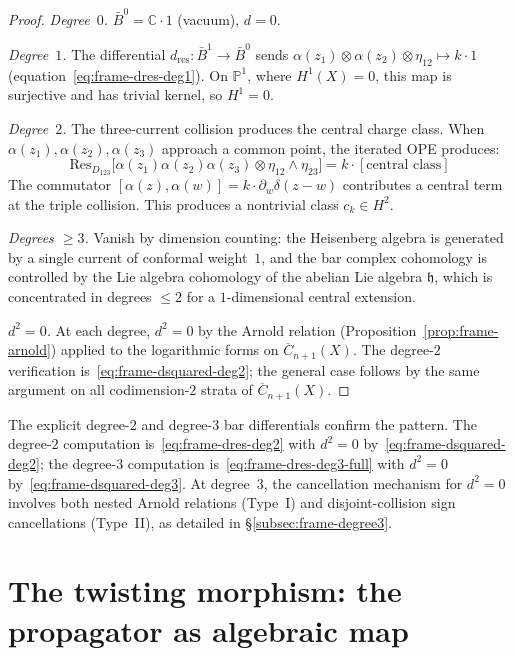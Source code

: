 \begin{proof}
\emph{Degree~$0$.}
$\bar{B}^0 = \mathbb{C} \cdot 1$ (vacuum), $d = 0$.

\emph{Degree~$1$.}
The differential $d_{\mathrm{res}}\colon \bar{B}^1 \to \bar{B}^0$
sends $\alpha(z_1) \otimes \alpha(z_2) \otimes \eta_{12} \mapsto k \cdot 1$
(equation~\eqref{eq:frame-dres-deg1}).
On $\mathbb{P}^1$, where $H^1(X) = 0$, this map is surjective
and has trivial kernel, so $H^1 = 0$.

\emph{Degree~$2$.}
The three-current collision produces the central charge class.
When $\alpha(z_1), \alpha(z_2), \alpha(z_3)$ approach a
common point, the iterated OPE produces:
\begin{equation}\label{eq:frame-triple-residue}
\mathrm{Res}_{D_{123}}\bigl[\alpha(z_1)\alpha(z_2)\alpha(z_3)
\otimes \eta_{12} \wedge \eta_{23}\bigr]
= k \cdot [\text{central class}]
\end{equation}
The commutator $[\alpha(z), \alpha(w)] = k \cdot
\partial_w\delta(z-w)$ contributes a central term at
the triple collision.  This produces a nontrivial
class $c_k \in H^2$.

\emph{Degrees $\geq 3$.}
Vanish by dimension counting: the Heisenberg algebra is
generated by a single current of conformal weight~$1$, and the
bar complex cohomology is controlled by the Lie algebra cohomology
of the abelian Lie algebra $\mathfrak{h}$, which is concentrated
in degrees $\leq 2$ for a $1$-dimensional central extension.

\emph{$d^2 = 0$.}
At each degree, $d^2 = 0$ by the Arnold relation
(Proposition~\ref{prop:frame-arnold}) applied to the
logarithmic forms on $\overline{C}_{n+1}(X)$.
The degree-$2$ verification is~\eqref{eq:frame-dsquared-deg2};
the general case follows by the same argument on all codimension-$2$
strata of $\overline{C}_{n+1}(X)$.
\end{proof}

The explicit degree-$2$ and degree-$3$ bar differentials confirm the
pattern.  The degree-$2$ computation is~\eqref{eq:frame-dres-deg2}
with $d^2 = 0$ by~\eqref{eq:frame-dsquared-deg2}; the degree-$3$
computation is~\eqref{eq:frame-dres-deg3-full} with $d^2 = 0$
by~\eqref{eq:frame-dsquared-deg3}.
At degree~$3$, the cancellation mechanism for $d^2 = 0$
involves both nested Arnold relations (Type~I) and disjoint-collision
sign cancellations (Type~II), as detailed in
\S\ref{subsec:frame-degree3}.

\section{The twisting morphism: the propagator as algebraic map}
\label{sec:frame-twisting-morphism}

